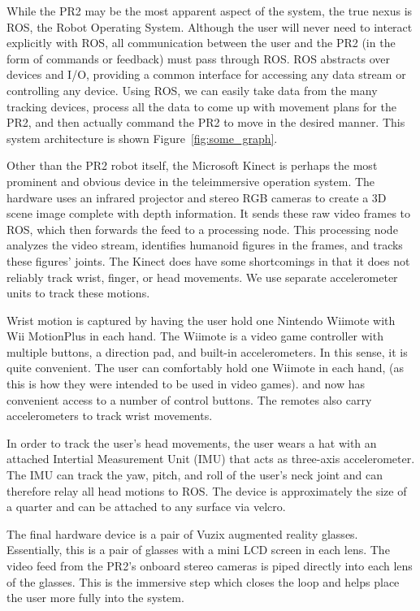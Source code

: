\documentclass{sig-alternate}
\begin{document}
While the PR2 may be the most apparent aspect of the system,
the true nexus is ROS, the Robot Operating System. Although the
user will never need to interact explicitly with ROS, all communication between
the user and the PR2 (in the form of commands or feedback) must pass through ROS.
ROS abstracts over devices and I/O, providing a common interface for accessing
any data stream or controlling any device. Using ROS, we can easily take
data from the many tracking devices, process all the data to come up with
movement plans for the PR2, and then actually command the PR2 to move in the
desired manner. This system architecture is shown Figure~\ref{fig:some_graph}.

Other than the PR2 robot itself, the Microsoft Kinect is perhaps the most 
prominent and obvious device in the teleimmersive operation system. The
hardware uses an 
infrared projector and stereo RGB cameras to create a 3D scene image complete
with depth information. It sends these raw video frames to ROS, which then
forwards the feed to a processing node. This processing node analyzes the 
video stream, identifies humanoid figures in the frames, and tracks these 
figures' joints. The Kinect does have some shortcomings in that it does 
not reliably track wrist, finger, or head movements. We use separate 
accelerometer units to track these motions.

Wrist motion is captured by having the user hold one Nintendo Wiimote with 
Wii MotionPlus in each hand. The Wiimote is a video game controller with 
multiple buttons, a direction pad, and built-in accelerometers. In this sense,
it is quite convenient. The user can comfortably hold one Wiimote in each hand,
(as this is how they were intended to be used in video games). and now has
convenient access to a number of
control buttons. The remotes also carry accelerometers to track wrist movements.

In order to track the user's head movements, the user wears a hat
with an attached Intertial Measurement Unit (IMU) that acts as three-axis accelerometer. The IMU can track the yaw, pitch, and roll of the user's neck joint and can therefore relay all head motions to ROS. The device is
approximately the size of a quarter and can be attached to any surface via
velcro.

The final hardware device is a pair of Vuzix augmented reality glasses.
Essentially, this is a pair of glasses with a mini LCD screen in each lens.
The video feed from the PR2's onboard stereo cameras is piped
directly into each lens of the glasses. This is the immersive step which closes the loop and
helps place the user more fully into the system.
\end{document}
